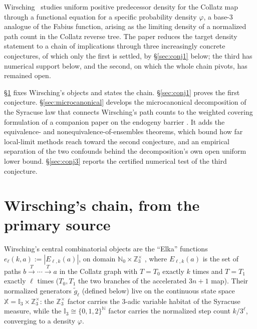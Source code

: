\documentclass[11pt]{article}
\theoremstyle{remark}
\begin{document}
Wirsching~\cite{Wirsching2003} studies uniform positive predecessor
density for the Collatz map through a functional equation for a
specific probability density $\varphi$, a base-$3$ analogue of the
Fabius function, arising as the limiting density of a normalized path
count in the Collatz reverse tree. The paper reduces the target
density statement to a chain of implications through three
increasingly concrete conjectures, of which only the first is settled,
by \S\ref{sec:conj1} below; the third has numerical support below, and
the second, on which the whole chain pivots, has remained open.

\S\ref{sec:chain} fixes Wirsching's objects and states the chain.
\S\ref{sec:conj1} proves the first conjecture.
\S\ref{sec:microcanonical} develops the microcanonical decomposition of
the Syracuse law that connects Wirsching's path counts to the weighted
covering formulation of a companion paper on the endogeny barrier
\cite{BarrierCompanion}. It adds the equivalence- and
nonequivalence-of-ensembles theorems, which bound how far local-limit
methods reach toward the second conjecture, and an empirical
separation of the two confounds behind the decomposition's own open
uniform lower bound.
\S\ref{sec:conj3} reports the certified numerical test of the third
conjecture.

\section{Wirsching's chain, from the primary source}
\label{sec:chain}

Wirsching's central combinatorial objects are the ``Elka'' functions
$e_\ell(k,a):=|E_{\ell,k}(a)|$, on domain
$\mathbb N_0\times\mathbb Z_3^\times$ \cite[\S1--2]{Wirsching2003},
where $E_{\ell,k}(a)$ is the set of
paths $b\xrightarrow{T}\cdots\xrightarrow{T}a$ in the Collatz graph
with $T=T_0$ exactly $k$ times and $T=T_1$ exactly $\ell$ times
($T_0,T_1$ the two branches of the
accelerated $3n+1$ map). Their normalized generators $\widetilde
g_\ell$ (defined below) live on the continuous state space
$\mathbb X=\mathbb I_3\times\mathbb Z_3^\times$: the
$\mathbb Z_3^\times$ factor carries the $3$-adic variable habitat of
the Syracuse measure, while the $\mathbb I_3\cong\{0,1,2\}^{\mathbb
N}$ factor carries the normalized step count $k/3^\ell$, converging to
a density $\varphi$.
\end{document}
